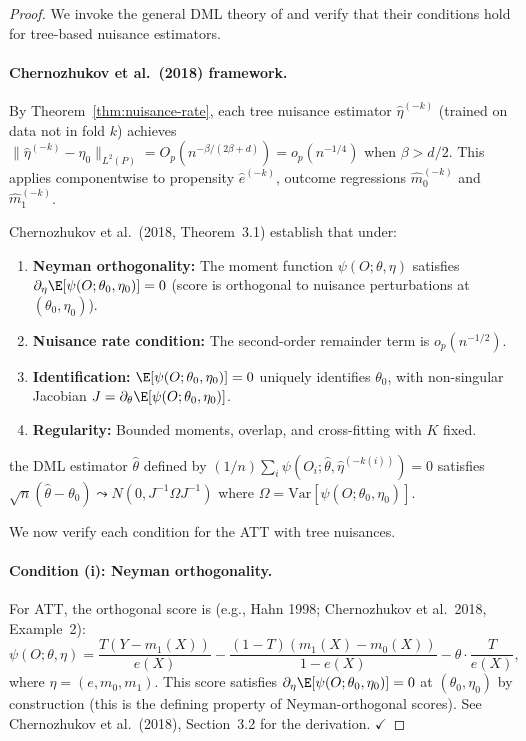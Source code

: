 \begin{proof}
We invoke the general DML theory of \citet{chernozhukov2018} and verify that their conditions hold for tree-based nuisance estimators.

\paragraph{Chernozhukov et al.\ (2018) framework.}
By Theorem~\ref{thm:nuisance-rate}, each tree nuisance estimator $\hat\eta^{(-k)}$ (trained on data not in fold $k$) achieves $\|\hat\eta^{(-k)} - \eta_0\|_{L^2(P)} = O_p(n^{-\beta/(2\beta+d)}) = o_p(n^{-1/4})$ when $\beta > d/2$. This applies componentwise to propensity $\hat{e}^{(-k)}$, outcome regressions $\hat{m}_0^{(-k)}$ and $\hat{m}_1^{(-k)}$.

Chernozhukov et al.\ (2018, Theorem~3.1) establish that under:
\begin{enumerate}[label=(\roman*)]
\item \textbf{Neyman orthogonality:} The moment function $\psi(O; \theta, \eta)$ satisfies $\partial_\eta \E[\psi(O; \theta_0, \eta_0)] = 0$ (score is orthogonal to nuisance perturbations at $(\theta_0, \eta_0)$).
\item \textbf{Nuisance rate condition:} The second-order remainder term is $o_p(n^{-1/2})$.
\item \textbf{Identification:} $\E[\psi(O; \theta_0, \eta_0)] = 0$ uniquely identifies $\theta_0$, with non-singular Jacobian $J = \partial_\theta \E[\psi(O; \theta_0, \eta_0)]$.
\item \textbf{Regularity:} Bounded moments, overlap, and cross-fitting with $K$ fixed.
\end{enumerate}
the DML estimator $\hat\theta$ defined by $(1/n)\sum_i \psi(O_i; \hat\theta, \hat\eta^{(-k(i))}) = 0$ satisfies $\sqrt{n}(\hat\theta - \theta_0) \leadsto N(0, J^{-1} \Omega J^{-1})$ where $\Omega = \text{Var}[\psi(O; \theta_0, \eta_0)]$.

We now verify each condition for the ATT with tree nuisances.

\paragraph{Condition (i): Neyman orthogonality.}
For ATT, the orthogonal score is (e.g., Hahn 1998; Chernozhukov et al.\ 2018, Example~2):
\[
\psi(O; \theta, \eta) = \frac{T(Y - m_1(X))}{e(X)} - \frac{(1-T)(m_1(X) - m_0(X))}{1 - e(X)} - \theta \cdot \frac{T}{e(X)},
\]
where $\eta = (e, m_0, m_1)$. This score satisfies $\partial_\eta \E[\psi(O; \theta_0, \eta_0)] = 0$ at $(\theta_0, \eta_0)$ by construction (this is the defining property of Neyman-orthogonal scores). See Chernozhukov et al.\ (2018), Section~3.2 for the derivation. $\checkmark$


\end{proof}
